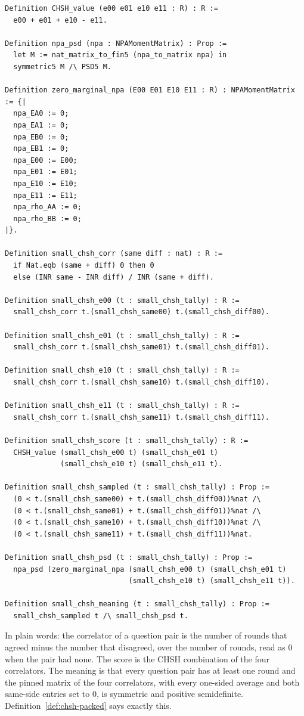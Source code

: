 {\scriptsize
\begin{verbatim}
Definition CHSH_value (e00 e01 e10 e11 : R) : R :=
  e00 + e01 + e10 - e11.

Definition npa_psd (npa : NPAMomentMatrix) : Prop :=
  let M := nat_matrix_to_fin5 (npa_to_matrix npa) in
  symmetric5 M /\ PSD5 M.

Definition zero_marginal_npa (E00 E01 E10 E11 : R) : NPAMomentMatrix := {|
  npa_EA0 := 0;
  npa_EA1 := 0;
  npa_EB0 := 0;
  npa_EB1 := 0;
  npa_E00 := E00;
  npa_E01 := E01;
  npa_E10 := E10;
  npa_E11 := E11;
  npa_rho_AA := 0;
  npa_rho_BB := 0;
|}.

Definition small_chsh_corr (same diff : nat) : R :=
  if Nat.eqb (same + diff) 0 then 0
  else (INR same - INR diff) / INR (same + diff).

Definition small_chsh_e00 (t : small_chsh_tally) : R :=
  small_chsh_corr t.(small_chsh_same00) t.(small_chsh_diff00).

Definition small_chsh_e01 (t : small_chsh_tally) : R :=
  small_chsh_corr t.(small_chsh_same01) t.(small_chsh_diff01).

Definition small_chsh_e10 (t : small_chsh_tally) : R :=
  small_chsh_corr t.(small_chsh_same10) t.(small_chsh_diff10).

Definition small_chsh_e11 (t : small_chsh_tally) : R :=
  small_chsh_corr t.(small_chsh_same11) t.(small_chsh_diff11).

Definition small_chsh_score (t : small_chsh_tally) : R :=
  CHSH_value (small_chsh_e00 t) (small_chsh_e01 t)
             (small_chsh_e10 t) (small_chsh_e11 t).

Definition small_chsh_sampled (t : small_chsh_tally) : Prop :=
  (0 < t.(small_chsh_same00) + t.(small_chsh_diff00))%nat /\
  (0 < t.(small_chsh_same01) + t.(small_chsh_diff01))%nat /\
  (0 < t.(small_chsh_same10) + t.(small_chsh_diff10))%nat /\
  (0 < t.(small_chsh_same11) + t.(small_chsh_diff11))%nat.

Definition small_chsh_psd (t : small_chsh_tally) : Prop :=
  npa_psd (zero_marginal_npa (small_chsh_e00 t) (small_chsh_e01 t)
                             (small_chsh_e10 t) (small_chsh_e11 t)).

Definition small_chsh_meaning (t : small_chsh_tally) : Prop :=
  small_chsh_sampled t /\ small_chsh_psd t.
\end{verbatim}}

In plain words: the correlator of a question pair is the number of rounds that agreed minus the
number that disagreed, over the number of rounds, read as 0 when the pair had none. The score is the
CHSH combination of the four correlators. The meaning is that every question pair has at least one
round and the pinned matrix of the four correlators, with every one-sided average and both
same-side entries set to 0, is symmetric and positive semidefinite.
Definition~\ref{def:chsh-packed} says exactly this.

